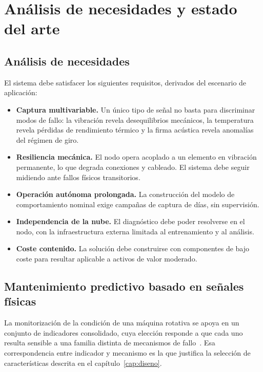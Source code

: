 \chapter{Análisis de necesidades y estado del arte}
\label{cap:estado-arte}

\section{Análisis de necesidades}

El sistema debe satisfacer los siguientes requisitos, derivados del escenario de aplicación:

\begin{itemize}
    \item \textbf{Captura multivariable.} Un único tipo de señal no basta para discriminar
        modos de fallo: la vibración revela desequilibrios mecánicos, la temperatura revela
        pérdidas de rendimiento térmico y la firma acústica revela anomalías del régimen de
        giro.
    \item \textbf{Resiliencia mecánica.} El nodo opera acoplado a un elemento en vibración
        permanente, lo que degrada conexiones y cableado. El sistema debe seguir midiendo
        ante fallos físicos transitorios.
    \item \textbf{Operación autónoma prolongada.} La construcción del modelo de
        comportamiento nominal exige campañas de captura de días, sin supervisión.
    \item \textbf{Independencia de la nube.} El diagnóstico debe poder resolverse en el
        nodo, con la infraestructura externa limitada al entrenamiento y al análisis.
    \item \textbf{Coste contenido.} La solución debe construirse con componentes de bajo
        coste para resultar aplicable a activos de valor moderado.
\end{itemize}

\section{Mantenimiento predictivo basado en señales físicas}

La monitorización de la condición de una máquina rotativa se apoya en un conjunto de indicadores
consolidado, cuya elección responde a que cada uno resulta sensible a una familia distinta de
mecanismos de fallo~\cite{randall2011}. Esa correspondencia entre indicador y mecanismo es la
que justifica la selección de características descrita en el capítulo~\ref{cap:diseno}.

